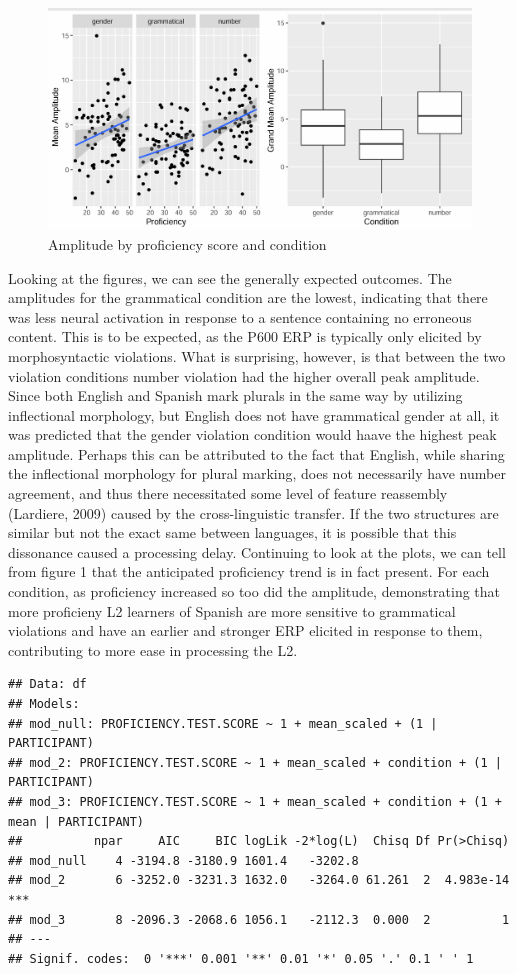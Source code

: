 \documentclass[
  man,floatsintext]{apa6}
\begin{document}
\begin{figure}[H]
\includegraphics[width=\linewidth]{figs/plots} \caption{Amplitude by proficiency score and condition}\label{fig:fig-plots}
\end{figure}

Looking at the figures, we can see the generally expected outcomes. The amplitudes for the grammatical condition are the lowest, indicating that there was less neural activation in response to a sentence containing no erroneous content. This is to be expected, as the P600 ERP is typically only elicited by morphosyntactic violations. What is surprising, however, is that between the two violation conditions number violation had the higher overall peak amplitude. Since both English and Spanish mark plurals in the same way by utilizing inflectional morphology, but English does not have grammatical gender at all, it was predicted that the gender violation condition would haave the highest peak amplitude. Perhaps this can be attributed to the fact that English, while sharing the inflectional morphology for plural marking, does not necessarily have number agreement, and thus there necessitated some level of feature reassembly (Lardiere, 2009) caused by the cross-linguistic transfer. If the two structures are similar but not the exact same between languages, it is possible that this dissonance caused a processing delay.
Continuing to look at the plots, we can tell from figure 1 that the anticipated proficiency trend is in fact present. For each condition, as proficiency increased so too did the amplitude, demonstrating that more proficieny L2 learners of Spanish are more sensitive to grammatical violations and have an earlier and stronger ERP elicited in response to them, contributing to more ease in processing the L2.

\begin{verbatim}
## Data: df
## Models:
## mod_null: PROFICIENCY.TEST.SCORE ~ 1 + mean_scaled + (1 | PARTICIPANT)
## mod_2: PROFICIENCY.TEST.SCORE ~ 1 + mean_scaled + condition + (1 | PARTICIPANT)
## mod_3: PROFICIENCY.TEST.SCORE ~ 1 + mean_scaled + condition + (1 + mean | PARTICIPANT)
##          npar     AIC     BIC logLik -2*log(L)  Chisq Df Pr(>Chisq)    
## mod_null    4 -3194.8 -3180.9 1601.4   -3202.8                         
## mod_2       6 -3252.0 -3231.3 1632.0   -3264.0 61.261  2  4.983e-14 ***
## mod_3       8 -2096.3 -2068.6 1056.1   -2112.3  0.000  2          1    
## ---
## Signif. codes:  0 '***' 0.001 '**' 0.01 '*' 0.05 '.' 0.1 ' ' 1
\end{verbatim}
\end{document}
